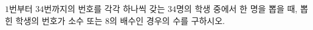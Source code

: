 \hspace*{2mm}\begin{minipage}[t]{\dimexpr\linewidth-2mm\relax}\vspace{0pt}
$1$번부터 $34$번까지의 번호를 각각 하나씩 갖는 $34$명의 학생 중에서 한 명을 뽑을 때, 뽑힌 학생의 번호가 소수 또는 $8$의 배수인 경우의 수를 구하시오.\end{minipage}
